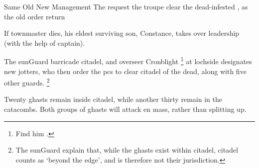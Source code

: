 {Same Old New Management}%
{The  request the troupe clear the dead-infested , as the old order return}%

If \gls{townmaster} dies, his eldest surviving son, Constance, takes over leadership (with the help of \gls{captain}).

The \gls{sunGuard} barricade \gls{citadel}, and \gls{overseer} Cronblight%
\footnote{Find him .}
at \gls{lochside} designates new \glspl{jotter}, who then order the \glspl{pc} to clear \gls{citadel} of the dead, along with five other \glspl{guard}.%
\footnote{The \gls{sunGuard} explain that, while the ghasts exist within \gls{citadel}, \gls{citadel} counts as `beyond the \gls{edge}', and is therefore not their jurisdiction.}

Twenty ghasts remain inside \gls{citadel}, while another thirty remain in the catacombs.
Both groups of ghasts will attack en mass, rather than splitting up.

